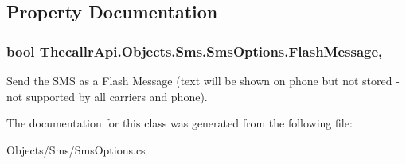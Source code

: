 \subsection{Property Documentation}
\hypertarget{class_thecallr_api_1_1_objects_1_1_sms_1_1_sms_options_ad526cb3d8a75a16cfcd39968a51fd0d3}{
\subsubsection[{Flash\+Message}]{\setlength{\rightskip}{0pt plus 5cm}bool Thecallr\+Api.\+Objects.\+Sms.\+Sms\+Options.\+Flash\+Message\hspace{0.3cm}{\ttfamily [get]}, {\ttfamily [set]}}}\label{class_thecallr_api_1_1_objects_1_1_sms_1_1_sms_options_ad526cb3d8a75a16cfcd39968a51fd0d3}


Send the S\+M\+S as a Flash Message (text will be shown on phone but not stored -\/ not supported by all carriers and phone). 



The documentation for this class was generated from the following file\+:\begin{DoxyCompactItemize}
\item 
Objects/\+Sms/Sms\+Options.\+cs\end{DoxyCompactItemize}

